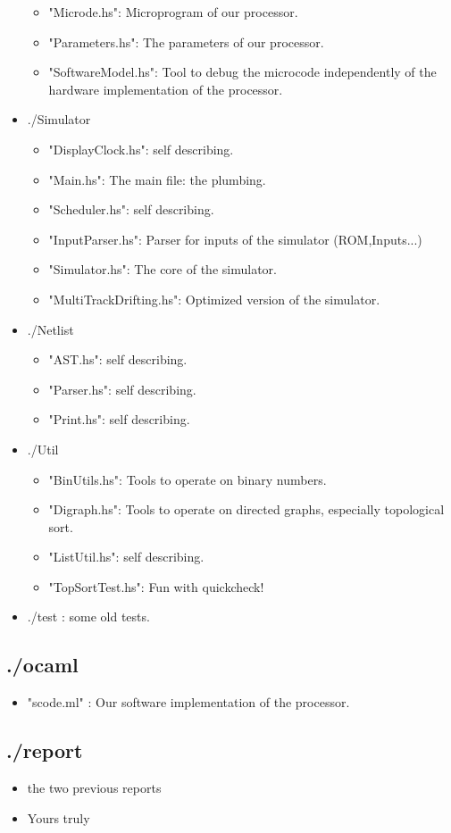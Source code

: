 \documentclass[a4paper, 11pt]{article}
\begin{document}
\begin{itemize}
\begin{itemize}
\item "Microde.hs": Microprogram of our processor.
\item "Parameters.hs": The parameters of our processor.
\item "SoftwareModel.hs": Tool to debug the microcode independently of the
hardware implementation of the processor.  
\end{itemize}
\item ./Simulator
\begin{itemize}
\item "DisplayClock.hs": self describing.
\item "Main.hs": The main file: the plumbing.
\item "Scheduler.hs": self describing.
\item "InputParser.hs": Parser for inputs of the simulator (ROM,Inputs...)
\item "Simulator.hs": The core of the simulator.
\item "MultiTrackDrifting.hs": Optimized version of the simulator.
\end{itemize}
\item ./Netlist 
\begin{itemize}
\item "AST.hs": self describing.
\item "Parser.hs": self describing.
\item "Print.hs": self describing.
\end{itemize}
\item ./Util
\begin{itemize}
\item "BinUtils.hs": Tools to operate on binary numbers.
\item "Digraph.hs": Tools to operate on directed graphs, especially topological sort.
\item "ListUtil.hs": self describing.
\item "TopSortTest.hs": Fun with quickcheck!
\end{itemize}
\item ./test : some old tests.
\end{itemize}

\subsection{./ocaml}
\begin{itemize}
\item "scode.ml" : Our software implementation of the processor. 
\end{itemize}
\subsection{./report}
\begin{itemize}
\item the two previous reports
\item Yours truly
\end{itemize}




\end{document}

